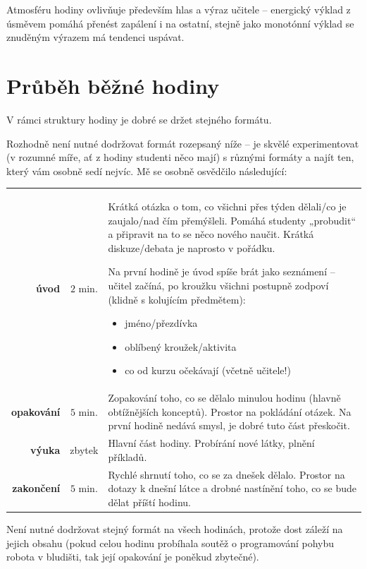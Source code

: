 Atmosféru hodiny ovlivňuje především hlas a výraz učitele -- energický výklad z úsměvem pomáhá přenést zapálení i na ostatní, stejně jako monotónní výklad se znuděným výrazem má tendenci uspávat.

\section{Průběh běžné hodiny}
V rámci struktury hodiny je dobré se držet stejného formátu.

Rozhodně není nutné dodržovat formát rozepsaný níže -- je skvělé experimentovat (v rozumné míře, ať z hodiny studenti něco mají) s různými formáty a najít ten, který vám osobně sedí nejvíc. Mě se osobně osvědčilo následující:

\begin{table}[h!]
	\begin{tabularx}{\textwidth}{rc>{\setlength{\parskip}{0.5\baselineskip}}X} \toprule
		\textbf{úvod} & $2$ min. & Krátká otázka o tom, co všichni přes týden dělali/co je zaujalo/nad čím přemýšleli. Pomáhá studenty „probudit“ a připravit na to se něco nového naučit. Krátká diskuze/debata je naprosto v pořádku.

		Na první hodině je úvod spíše brát jako seznámení -- učitel začíná, po kroužku všichni postupně zodpoví (klidně s kolujícím předmětem):
		\begin{itemize}[label=\textbullet, leftmargin=20pt,
							after*={\mbox{}\vspace{-\baselineskip}}]
			\item jméno/přezdívka
			\item oblíbený kroužek/aktivita
			\item co od kurzu očekávají (včetně učitele!)
		\end{itemize}
		\\
		\noalign{\vspace{8pt}}
		\textbf{opakování} & $5$ min. & Zopakování toho, co se dělalo minulou hodinu (hlavně obtížnějších konceptů). Prostor na pokládání otázek. Na první hodině nedává smysl, je dobré tuto část přeskočit. \\
		\noalign{\vspace{8pt}}
		\textbf{výuka} & zbytek &  Hlavní část hodiny. Probírání nové látky, plnění příkladů. \\
		\noalign{\vspace{8pt}}
		\textbf{zakončení} & $5$ min. & Rychlé shrnutí toho, co se za dnešek dělalo. Prostor na dotazy k dnešní látce a drobné nastínění toho, co se bude dělat příští hodinu. \\
		\bottomrule
	\end{tabularx}
\end{table}

Není nutné dodržovat stejný formát na všech hodinách, protože dost záleží na jejich obsahu (pokud celou hodinu probíhala soutěž o programování pohybu robota v bludišti, tak její opakování je poněkud zbytečné).


